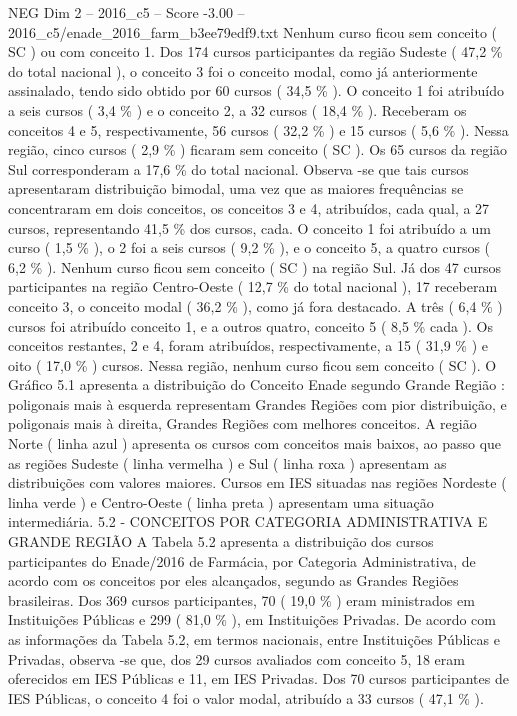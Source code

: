 \begin{textsample}{NEG Dim 2 – 2016\_c5 – Score -3.00 – 2016\_c5/enade\_2016\_farm\_b3ee79edf9.txt}
Nenhum curso ficou sem conceito ( SC ) ou com conceito 1.
Dos 174 cursos participantes da região Sudeste ( 47,2 \% do total nacional ), o conceito 3 foi o conceito modal, como já anteriormente assinalado, tendo sido obtido por 60 cursos ( 34,5 \% ).
O conceito 1 foi atribuído a seis cursos ( 3,4 \% ) e o conceito 2, a 32 cursos ( 18,4 \% ).
Receberam os conceitos 4 e 5, respectivamente, 56 cursos ( 32,2 \% ) e 15 cursos ( 5,6 \% ).
Nessa região, cinco cursos ( 2,9 \% ) ficaram sem conceito ( SC ).
Os 65 cursos da região Sul corresponderam a 17,6 \% do total nacional.
Observa -se que tais cursos apresentaram distribuição bimodal, uma vez que as maiores frequências se concentraram em dois conceitos, os conceitos 3 e 4, atribuídos, cada qual, a 27 cursos, representando 41,5 \% dos cursos, cada.
O conceito 1 foi atribuído a um curso ( 1,5 \% ), o 2 foi a seis cursos ( 9,2 \% ), e o conceito 5, a quatro cursos ( 6,2 \% ).
Nenhum curso ficou sem conceito ( SC ) na região Sul.
Já dos 47 cursos participantes na região Centro-Oeste ( 12,7 \% do total nacional ), 17 receberam conceito 3, o conceito modal ( 36,2 \% ), como já fora destacado.
A três ( 6,4 \% ) cursos foi atribuído conceito 1, e a outros quatro, conceito 5 ( 8,5 \% cada ).
Os conceitos restantes, 2 e 4, foram atribuídos, respectivamente, a 15 ( 31,9 \% ) e oito ( 17,0 \% ) cursos.
Nessa região, nenhum curso ficou sem conceito ( SC ).
O Gráfico 5.1 apresenta a distribuição do Conceito Enade segundo Grande Região : poligonais mais à esquerda representam Grandes Regiões com pior distribuição, e poligonais mais à direita, Grandes Regiões com melhores conceitos.
A região Norte ( linha azul ) apresenta os cursos com conceitos mais baixos, ao passo que as regiões Sudeste ( linha vermelha ) e Sul ( linha roxa ) apresentam as distribuições com valores maiores.
Cursos em IES situadas nas regiões Nordeste ( linha verde ) e Centro-Oeste ( linha preta ) apresentam uma situação intermediária. 5.2 - CONCEITOS POR CATEGORIA ADMINISTRATIVA E GRANDE REGIÃO A Tabela 5.2 apresenta a distribuição dos cursos participantes do Enade/2016 de Farmácia, por Categoria Administrativa, de acordo com os conceitos por eles alcançados, segundo as Grandes Regiões brasileiras.
Dos 369 cursos participantes, 70 ( 19,0 \% ) eram ministrados em Instituições Públicas e 299 ( 81,0 \% ), em Instituições Privadas.
De acordo com as informações da Tabela 5.2, em termos nacionais, entre Instituições Públicas e Privadas, observa -se que, dos 29 cursos avaliados com conceito 5, 18 eram oferecidos em IES Públicas e 11, em IES Privadas.
Dos 70 cursos participantes de IES Públicas, o conceito 4 foi o valor modal, atribuído a 33 cursos ( 47,1 \% ).

\end{textsample}

